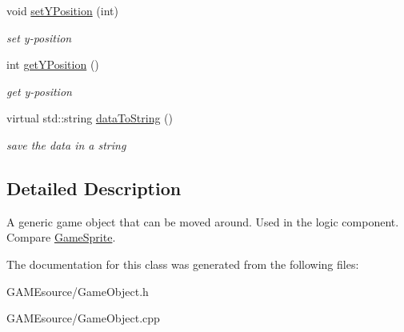 \begin{DoxyCompactItemize}
\mbox{\label{class_game_object_a09913a2ffb23b697a0d79bf1145c0f01}} 
void \mbox{\hyperlink{class_game_object_a09913a2ffb23b697a0d79bf1145c0f01}{set\+Y\+Position}} (int)
\begin{DoxyCompactList}\small\item\em set y-\/position \end{DoxyCompactList}\item 
\mbox{\label{class_game_object_a2c986fbc8dc62a1c187466a4ab48bebd}} 
int \mbox{\hyperlink{class_game_object_a2c986fbc8dc62a1c187466a4ab48bebd}{get\+Y\+Position}} ()
\begin{DoxyCompactList}\small\item\em get y-\/position \end{DoxyCompactList}\item 
\mbox{\label{class_game_object_af9bc07709ad106c507cccdef63d86254}} 
virtual std\+::string \mbox{\hyperlink{class_game_object_af9bc07709ad106c507cccdef63d86254}{data\+To\+String}} ()
\begin{DoxyCompactList}\small\item\em save the data in a string \end{DoxyCompactList}\end{DoxyCompactItemize}


\subsection{Detailed Description}
A generic game object that can be moved around. Used in the logic component. Compare \mbox{\hyperlink{class_game_sprite}{Game\+Sprite}}. 

The documentation for this class was generated from the following files\+:\begin{DoxyCompactItemize}
\item 
G\+A\+M\+Esource/Game\+Object.\+h\item 
G\+A\+M\+Esource/Game\+Object.\+cpp\end{DoxyCompactItemize}
